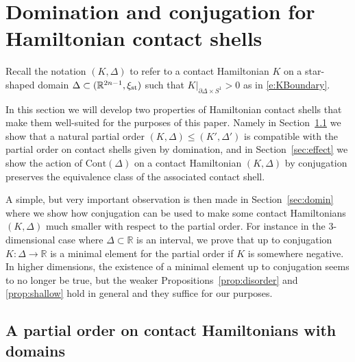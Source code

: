 \documentclass[12pt]{paper}
\theoremstyle{plain}
\theoremstyle{definition}
\newcommand{\p}{\partial}
\newcommand{\R}{{\mathbb{R}}}
\newcommand{\st}{{\rm st}}
\newcommand{\CCont}{\mathrm{Cont}}
\numberwithin{figure}{section}
\begin{document}

   
\section{Domination and conjugation for Hamiltonian contact shells}\label{sec:conjugation}

Recall the notation $(K, \Delta)$ to refer to a contact Hamiltonian $K$ on a star-shaped domain
$\Delta \subset (\R^{2n-1}, \xi_\st)$ such that $K|_{\p \Delta \times S^1} > 0$ as in \eqref{e:KBoundary}.

In this section we will develop two properties of Hamiltonian contact shells that make them well-suited for the purposes of this paper.  Namely in Section~\ref{sec:PartialOrder} we show that a natural partial order $(K, \Delta) \leq (K', \Delta')$ is compatible with the partial order on contact shells given by domination, and in Section~\ref{sec:effect} we show the action of
$\CCont(\Delta)$ on a contact Hamiltonian $(K, \Delta)$ by conjugation preserves the equivalence class of the associated contact shell.  

A simple, but very important  observation is then made in Section~\ref{sec:domin} where  we show how  conjugation can be used to make  some
 contact Hamiltonians $(K, \Delta)$  much smaller with respect to the partial order.  For instance in the $3$-dimensional case
 where $\Delta \subset \R$ is an interval, we prove that up to conjugation $K: \Delta \to \R$ is a minimal element for the partial order if $K$ is somewhere negative.  In higher dimensions, the existence of a minimal element up to conjugation seems to no longer be true, but the weaker Propositions~\ref{prop:disorder} and \ref{prop:shallow} hold in general and they suffice for our purposes.





\subsection{A partial order on contact Hamiltonians with domains}\label{sec:PartialOrder}
\end{document}
